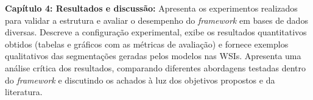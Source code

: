 \textbf{Capítulo 4: Resultados e discussão:} Apresenta os experimentos realizados para validar a estrutura e avaliar o desempenho do \textit{framework} em bases de dados diversas. Descreve a configuração experimental, exibe os resultados quantitativos obtidos (tabelas e gráficos com as métricas de avaliação) e fornece exemplos qualitativos das segmentações geradas pelos modelos nas WSIs. Apresenta uma análise crítica dos resultados, comparando diferentes abordagens testadas dentro do \textit{framework} e discutindo os achados à luz dos objetivos propostos e da literatura.